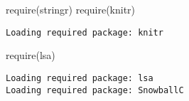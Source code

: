 \documentclass[
  10pt,
  letterpaper,
  DIV=11,
  numbers=noendperiod,
  twoside]{scrartcl}
\newenvironment{Shaded}{\begin{snugshade}}{\end{snugshade}}
\newcommand{\FunctionTok}[1]{\textcolor[rgb]{0.28,0.35,0.67}{#1}}
\newcommand{\NormalTok}[1]{\textcolor[rgb]{0.00,0.23,0.31}{#1}}
\begin{document}
\begin{Shaded}
\begin{Highlighting}[]
\FunctionTok{require}\NormalTok{(stringr)}
\FunctionTok{require}\NormalTok{(knitr)}
\end{Highlighting}
\end{Shaded}

\begin{verbatim}
Loading required package: knitr
\end{verbatim}

\begin{Shaded}
\begin{Highlighting}[]
\FunctionTok{require}\NormalTok{(lsa)}
\end{Highlighting}
\end{Shaded}

\begin{verbatim}
Loading required package: lsa
Loading required package: SnowballC
\end{verbatim}
\end{document}
